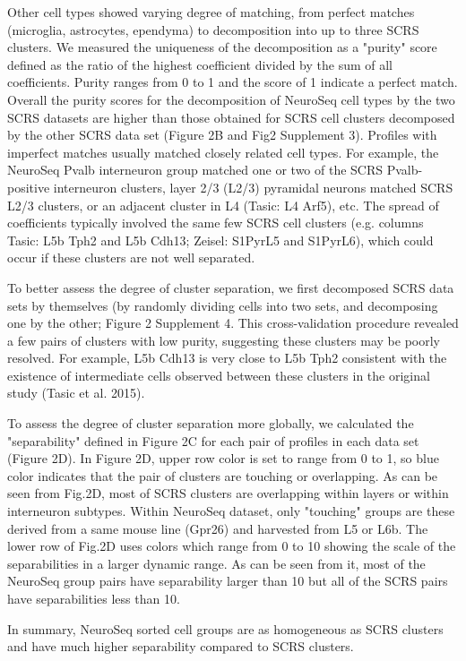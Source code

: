 Other cell types showed varying degree of matching, from perfect matches (microglia, astrocytes, ependyma) to decomposition into up to three SCRS clusters. We measured the uniqueness of the decomposition as a "purity" score defined as the ratio of the highest coefficient divided by the sum of all coefficients. Purity ranges from 0 to 1 and the score of 1 indicate a perfect match. Overall the purity scores for the decomposition of NeuroSeq cell types by the two SCRS datasets are higher than those obtained for SCRS cell clusters decomposed by the other SCRS data set (Figure 2B and Fig2 Supplement 3). Profiles with imperfect matches usually matched closely related cell types. For example, the NeuroSeq Pvalb interneuron group matched one or two of the SCRS Pvalb-positive interneuron clusters, layer 2/3 (L2/3) pyramidal neurons matched SCRS L2/3 clusters, or an adjacent cluster in L4 (Tasic: L4 Arf5), etc. The spread of coefficients typically involved the same few SCRS cell clusters (e.g. columns Tasic: L5b Tph2 and L5b Cdh13; Zeisel: S1PyrL5 and S1PyrL6), which could occur if these clusters are not well separated. 

To better assess the degree of cluster separation, we first decomposed SCRS data sets by themselves (by randomly dividing cells into two sets, and decomposing one by the other; Figure 2 Supplement 4. This cross-validation procedure revealed a few pairs of clusters with low purity, suggesting these clusters may be poorly resolved. For example, L5b Cdh13 is very close to L5b Tph2 consistent with the existence of intermediate cells observed between these clusters in the original study (Tasic et al. 2015).  

To assess the degree of cluster separation more globally, we calculated the "separability" defined in Figure 2C for each pair of profiles in each data set (Figure 2D). In Figure 2D, upper row color is set to range from 0 to 1, so blue color indicates that the pair of clusters are touching or overlapping. As can be seen from Fig.2D, most of SCRS clusters are overlapping within layers or within interneuron subtypes. Within NeuroSeq dataset, only "touching" groups are these derived from a same mouse line (Gpr26) and harvested from L5 or L6b.  The lower row of Fig.2D uses colors which range from 0 to 10 showing the scale of the separabilities in a larger dynamic range. As can be seen from it, most of the NeuroSeq group pairs have separability larger than 10 but all of the SCRS pairs have separabilities less than 10.

In summary, NeuroSeq sorted cell groups are as homogeneous as SCRS clusters and have much higher separability compared to SCRS clusters. 









